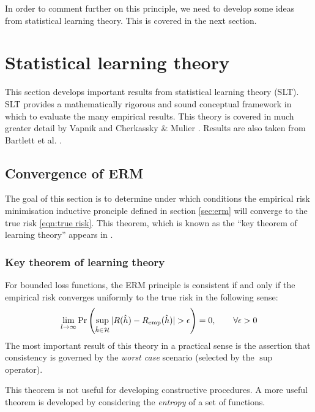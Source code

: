 In order to comment further on this principle, we need to develop some
ideas from statistical learning theory.  This is covered in the next
section.






\section{Statistical learning theory}
\label{sec:slt}

This section develops important results from statistical learning
theory (SLT).  SLT provides a mathematically rigorous and sound
conceptual framework in which to evaluate the many empirical results.
This theory is covered in much greater detail by Vapnik
\cite{Vapnik98} and Cherkassky \& Mulier \cite{Cherkassky98}.  Results
are also taken from Bartlett et al. \cite{Bartlett98a}.


\subsection{Convergence of ERM}

The goal of this section is to determine under which conditions the
empirical risk minimisation inductive pronciple defined in section
\ref{sec:erm} will converge to the true risk \ref{eqn:true risk}.
This theorem, which is known as the ``key theorem of learning theory''
appears in \cite{Cherkassky98}.

\subsubsection{Key theorem of learning theory}

For bounded loss functions, the ERM principle is consistent if and
only if the empirical risk converges uniformly to the true risk in the
following sense:
%
\begin{equation}
\lim_{l \rightarrow \infty} \Pr \left( \sup_{\hat{h} \in \mathcal{H}} 
| R(\hat{h}) - R_{\mathrm{emp}}(\hat{h}) | > \epsilon \right) = 0,
\qquad \forall \epsilon > 0
\end{equation}
%
The most important result of this theory in a practical sense is the
assertion that consistency is governed by the \emph{worst case}
scenario (selected by the $\sup$ operator).

This theorem is not useful for developing constructive procedures.  A
more useful theorem is developed by considering the \emph{entropy} of
a set of functions.

